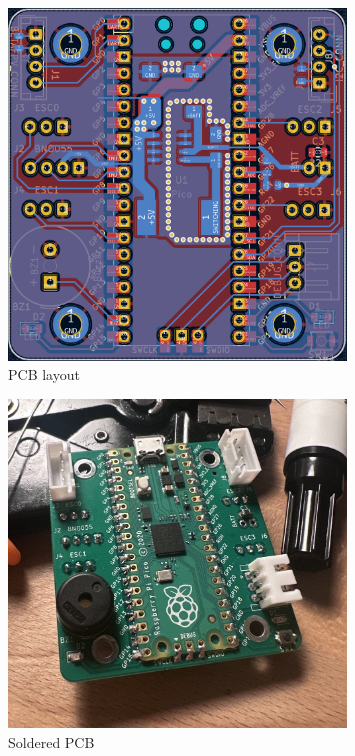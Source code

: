 \documentclass{article}
\begin{document}
\begin{figure}[H]
    \centering
    \includegraphics[width=0.8\textwidth]{board_pcb.png}
    \caption{PCB layout}
\end{figure}

\begin{figure}[H]
    \centering
    \includegraphics[width=0.8\textwidth]{board_soldered.jpg}
    \caption{Soldered PCB}
\end{figure}
\end{document}
